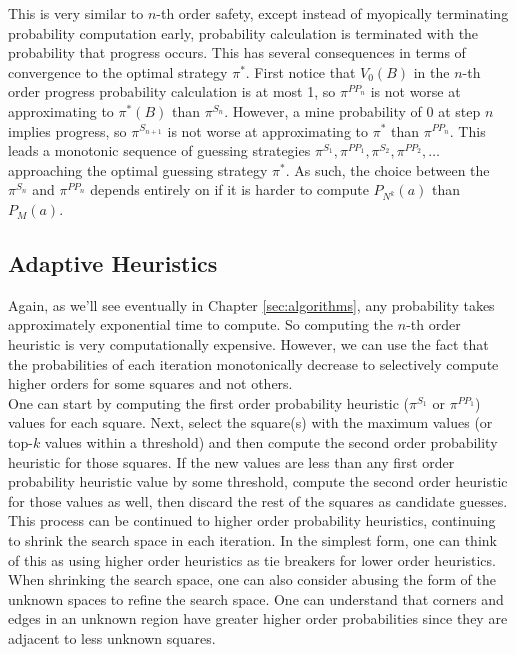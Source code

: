 This is very similar to $n$-th order safety, except instead of myopically terminating probability computation early, probability calculation is terminated with the probability that progress occurs. This has several consequences in terms of convergence to the optimal strategy $\pi^*$. First notice that $V_0(B)$ in the $n$-th order progress probability calculation is at most 1, so $\pi^{PP_n}$ is not worse at approximating to $\pi^*(B)$ than $\pi^{S_n}$. However, a mine probability of 0 at step $n$ implies progress, so $\pi^{S_{n+1}}$ is not worse at approximating to $\pi^*$ than $\pi^{PP_n}$. This leads a monotonic sequence of guessing strategies $\pi^{S_1},\pi^{PP_1},\pi^{S_2},\pi^{PP_2},\dots$ approaching the optimal guessing strategy $\pi^*$. As such, the choice between the $\pi^{S_n}$ and $\pi^{PP_n}$ depends entirely on if it is harder to compute $P_{N^k}(a)$ than $P_M(a)$.

\subsection{Adaptive Heuristics}

Again, as we'll see eventually in Chapter \ref{sec:algorithms}, any probability takes approximately exponential time to compute. So computing the $n$-th order heuristic is very computationally expensive. However, we can use the fact that the probabilities of each iteration monotonically decrease to selectively compute higher orders for some squares and not others.\\

One can start by computing the first order probability heuristic ($\pi^{S_1}$ or $\pi^{PP_1}$) values for each square. Next, select the square(s) with the maximum values (or top-$k$ values within a threshold) and then compute the second order probability heuristic for those squares. If the new values are less than any first order probability heuristic value by some threshold, compute the second order heuristic for those values as well, then discard the rest of the squares as candidate guesses. This process can be continued to higher order probability heuristics, continuing to shrink the search space in each iteration. In the simplest form, one can think of this as using higher order heuristics as tie breakers for lower order heuristics.\\

When shrinking the search space, one can also consider abusing the form of the unknown spaces to refine the search space. One can understand that corners and edges in an unknown region have greater higher order probabilities since they are adjacent to less unknown squares.\\